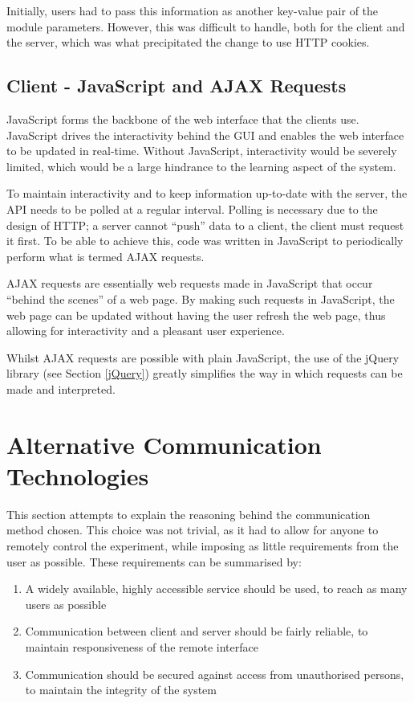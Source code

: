 Initially, users had to pass this information as another key-value pair of the module parameters. However, this was difficult to handle, both for the client and the server, which was what precipitated the change to use HTTP cookies.

\subsection{Client - JavaScript and AJAX Requests}

JavaScript forms the backbone of the web interface that the clients use. JavaScript drives the interactivity behind the GUI and enables the web interface to be updated in real-time. Without JavaScript, interactivity would be severely limited, which would be a large hindrance to the learning aspect of the system. 

To maintain interactivity and to keep information up-to-date with the server, the API needs to be polled at a regular interval. Polling is necessary due to the design of HTTP; a server cannot ``push'' data to a client, the client must request it first. To be able to achieve this, code was written in JavaScript to periodically perform what is termed AJAX requests. 

AJAX requests are essentially web requests made in JavaScript that occur ``behind the scenes'' of a web page. By making such requests in JavaScript, the web page can be updated without having the user refresh the web page, thus allowing for interactivity and a pleasant user experience.

Whilst AJAX requests are possible with plain JavaScript, the use of the jQuery library (see Section \ref{jQuery}) greatly simplifies the way in which requests can be made and interpreted.

\section{Alternative Communication Technologies}\label{Alternative Communication Technologies}

This section attempts to explain the reasoning behind the communication method chosen. This choice was not trivial, as it had to allow for anyone to remotely control the experiment, while imposing as little requirements from the user as possible. These requirements can be summarised by:
\begin{enumerate}
	\item A widely available, highly accessible service should be used, to reach as many users as possible
	\item Communication between client and server should be fairly reliable, to maintain responsiveness of the remote interface
	\item Communication should be secured against access from unauthorised persons, to maintain the integrity of the system
\end{enumerate}

